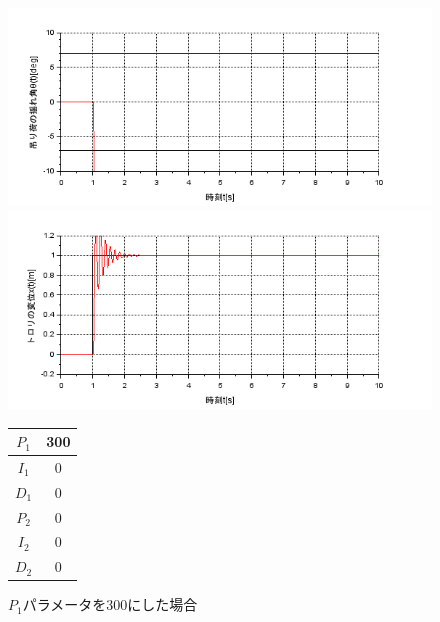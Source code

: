 \documentclass[dvipdfmx,titlepage,a4j]{jsarticle}  %
\begin{document}
\begin{figure}[H]
  \begin{minipage}{4.5cm}
    \centering
    \includegraphics[keepaspectratio, scale=0.35]{../graph/crane/ang-P1-300-I1-0-D1-0-P2-0-I2-0-D2-0.png}
  \end{minipage}
  \hfill
  \begin{minipage}{4.5cm}
    \centering
    \includegraphics[keepaspectratio, scale=0.35]{../graph/crane/po-P1-300-I1-0-D1-0-P2-0-I2-0-D2-0.png}
  \end{minipage}
  \hfill
  \begin{minipage}{3cm}
    \begin{center}
      \begin{tabular}{c|c}
        \hline
        $P_1$ & 300 \\ \hline
        $I_1$ & 0   \\ \hline
        $D_1$ & 0   \\ \hline
        $P_2$ & 0   \\ \hline
        $I_2$ & 0   \\ \hline
        $D_2$ & 0   \\
        \hline
      \end{tabular}
    \end{center}
  \end{minipage}
  \hfill
  \caption{$P_1$パラメータを300にした場合}
  \label{fig:crane:3}
\end{figure}
\end{document}
